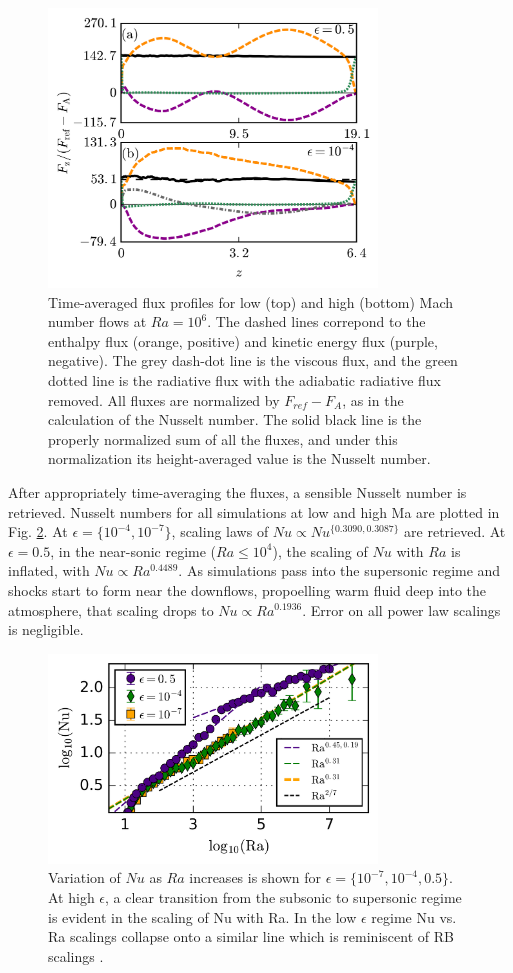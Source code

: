 \documentclass[aps, prl, twocolumn, groupedaddress, amsfonts, amssymb, amsmath]{revtex4-1}
\begin{document}
\begin{figure}[t]
\includegraphics[width=3.4375in]{./figs/fluxes_fig.png}
\caption{Time-averaged flux profiles for low (top) and high (bottom) Mach number flows at $Ra = 10^6$.  
The dashed lines correpond to the
enthalpy flux (orange, positive) and kinetic energy flux (purple, negative).  The grey dash-dot line is the
viscous flux, and the green dotted line is the radiative flux with the adiabatic radiative flux removed. All
fluxes are normalized by $F_{ref} - F_A$, as in the calculation of the Nusselt number.  The solid black line is
the properly normalized sum of all the fluxes, and under this normalization its height-averaged value is the
Nusselt number.
\label{fig:flux_profiles} }
\end{figure}

After appropriately time-averaging the fluxes, a sensible Nusselt number is retrieved.  Nusselt numbers for
all simulations at low and high Ma are plotted in Fig. \ref{fig:nu_v_ra}.  At $\epsilon = \{10^{-4}, 10^{-7}\}$,
scaling laws of $Nu \propto Nu^{\{0.3090, 0.3087\}}$ are retrieved.  At $\epsilon = 0.5$, in the near-sonic
regime ($Ra \leq 10^4$), the scaling of $Nu$ with $Ra$ is inflated, with $Nu \propto Ra^{0.4489}$.  As simulations
pass into the supersonic regime and shocks start to form near the downflows, propoelling warm fluid deep
into the atmosphere, that scaling drops to $Nu \propto Ra^{0.1936}$.  Error on all power law scalings is
negligible.

\begin{figure}[t]
\includegraphics[width=3.4375in]{./figs/nu_v_ra.png}
\caption{Variation of $Nu$ as $Ra$ increases is shown for $\epsilon = \{10^{-7}, 10^{-4}, 0.5\}$. 
At high $\epsilon$, a clear transition from the subsonic to supersonic regime is evident in the scaling
of Nu with Ra.  In the low $\epsilon$ regime Nu vs. Ra scalings collapse onto a similar line which is
reminiscent of RB scalings \cite{johnston&doering2009}.
\label{fig:nu_v_ra} }
\end{figure}
\end{document}
